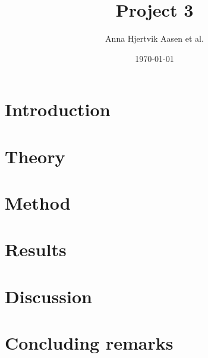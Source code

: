 \documentclass[twocolumn,english,notitlepage]{article}
\title{Project 3}
\author{Anna Hjertvik Aasen et al.}
\date{\today}
\begin{document}

\tableofcontents

\section{Introduction}


\section{Theory}


\section{Method}


\section{Results}


\section{Discussion}


\section{Concluding remarks}




\renewcommand{\theequation}{\thesection.\arabic{equation}}
\newpage
\begin{appendices}
     
\end{appendices}
\end{document}
